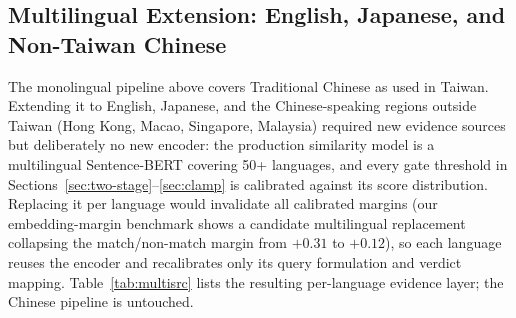 \documentclass[twoside]{llncs}
\begin{document}
\subsection{Multilingual Extension: English, Japanese, and Non-Taiwan Chinese}
\label{sec:multilingual}
The monolingual pipeline above covers Traditional Chinese as used in Taiwan. Extending it to English, Japanese, and the Chinese-speaking regions outside Taiwan (Hong Kong, Macao, Singapore, Malaysia) required new evidence sources but deliberately no new encoder: the production similarity model is a multilingual Sentence-BERT covering 50+ languages, and every gate threshold in Sections~\ref{sec:two-stage}--\ref{sec:clamp} is calibrated against its score distribution. Replacing it per language would invalidate all calibrated margins (our embedding-margin benchmark shows a candidate multilingual replacement collapsing the match/non-match margin from $+0.31$ to $+0.12$), so each language reuses the encoder and recalibrates only its query formulation and verdict mapping. Table~\ref{tab:multisrc} lists the resulting per-language evidence layer; the Chinese pipeline is untouched.
\end{document}
